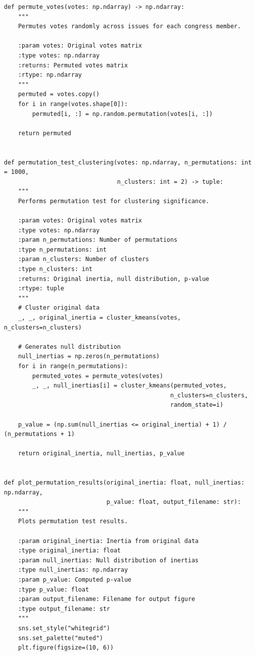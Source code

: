 \begin{verbatim}
def permute_votes(votes: np.ndarray) -> np.ndarray:
    """
    Permutes votes randomly across issues for each congress member.
    
    :param votes: Original votes matrix
    :type votes: np.ndarray
    :returns: Permuted votes matrix
    :rtype: np.ndarray
    """
    permuted = votes.copy()
    for i in range(votes.shape[0]):
        permuted[i, :] = np.random.permutation(votes[i, :])
    
    return permuted


def permutation_test_clustering(votes: np.ndarray, n_permutations: int = 1000,
                                n_clusters: int = 2) -> tuple:
    """
    Performs permutation test for clustering significance.
    
    :param votes: Original votes matrix
    :type votes: np.ndarray
    :param n_permutations: Number of permutations
    :type n_permutations: int
    :param n_clusters: Number of clusters
    :type n_clusters: int
    :returns: Original inertia, null distribution, p-value
    :rtype: tuple
    """
    # Cluster original data
    _, _, original_inertia = cluster_kmeans(votes, n_clusters=n_clusters)
    
    # Generates null distribution
    null_inertias = np.zeros(n_permutations)
    for i in range(n_permutations):
        permuted_votes = permute_votes(votes)
        _, _, null_inertias[i] = cluster_kmeans(permuted_votes, 
                                               n_clusters=n_clusters,
                                               random_state=i)
    
    p_value = (np.sum(null_inertias <= original_inertia) + 1) / (n_permutations + 1)
    
    return original_inertia, null_inertias, p_value


def plot_permutation_results(original_inertia: float, null_inertias: np.ndarray,
                             p_value: float, output_filename: str):
    """
    Plots permutation test results.
    
    :param original_inertia: Inertia from original data
    :type original_inertia: float
    :param null_inertias: Null distribution of inertias
    :type null_inertias: np.ndarray
    :param p_value: Computed p-value
    :type p_value: float
    :param output_filename: Filename for output figure
    :type output_filename: str
    """
    sns.set_style("whitegrid")
    sns.set_palette("muted")
    plt.figure(figsize=(10, 6))
    

\end{verbatim}
